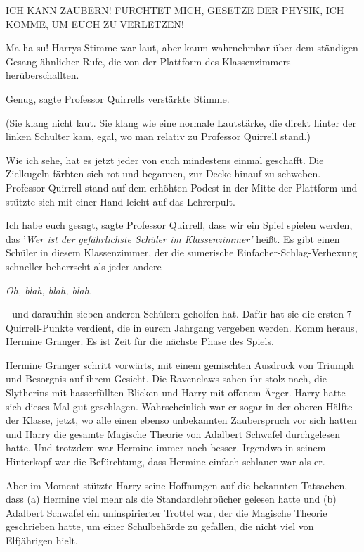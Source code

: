 ICH KANN ZAUBERN! FÜRCHTET MICH, GESETZE DER PHYSIK, ICH KOMME, UM EUCH ZU
VERLETZEN!

\glqq{}Ma-ha-su!\grqq{} Harrys Stimme war laut, aber kaum wahrnehmbar über dem
ständigen Gesang ähnlicher Rufe, die von der Plattform des Klassenzimmers
herüberschallten.

\glqq{}Genug\grqq{}, sagte Professor Quirrells verstärkte Stimme.

(Sie klang nicht laut. Sie klang wie eine normale Lautstärke, die direkt hinter
der linken Schulter kam, egal, wo man relativ zu Professor Quirrell stand.)

\glqq{}Wie ich sehe, hat es jetzt jeder von euch mindestens einmal
geschafft.\grqq{} Die Zielkugeln färbten sich rot und begannen, zur Decke hinauf
zu schweben. Professor Quirrell stand auf dem erhöhten Podest in der Mitte der
Plattform und stützte sich mit einer Hand leicht auf das Lehrerpult.

\glqq{}Ich habe euch gesagt\grqq{}, sagte Professor Quirrell, \glqq{}dass wir ein
Spiel spielen werden, das '\emph{Wer ist der gefährlichste Schüler im
Klassenzimmer'} heißt. Es gibt einen Schüler in diesem Klassenzimmer, der die
sumerische Einfacher-Schlag-Verhexung schneller beherrscht als jeder andere
-\grqq{}

\emph{Oh, blah, blah, blah.}

\glqq{}- und daraufhin sieben anderen Schülern geholfen hat. Dafür hat sie die
ersten 7 Quirrell-Punkte verdient, die in eurem Jahrgang vergeben werden. Komm
heraus, Hermine Granger. Es ist Zeit für die nächste Phase des Spiels.\grqq{}

Hermine Granger schritt vorwärts, mit einem gemischten Ausdruck von Triumph und
Besorgnis auf ihrem Gesicht. Die Ravenclaws sahen ihr stolz nach, die Slytherins
mit hasserfüllten Blicken und Harry mit offenem Ärger. Harry hatte sich dieses
Mal gut geschlagen. Wahrscheinlich war er sogar in der oberen Hälfte der Klasse,
jetzt, wo alle einen ebenso unbekannten Zauberspruch vor sich hatten und Harry
die gesamte Magische Theorie von Adalbert Schwafel durchgelesen hatte. Und
trotzdem war Hermine immer noch besser. Irgendwo in seinem Hinterkopf war die
Befürchtung, dass Hermine einfach schlauer war als er.

Aber im Moment stützte Harry seine Hoffnungen auf die bekannten Tatsachen, dass
(a) Hermine viel mehr als die Standardlehrbücher gelesen hatte und (b) Adalbert
Schwafel ein uninspirierter Trottel war, der die Magische Theorie geschrieben
hatte, um einer Schulbehörde zu gefallen, die nicht viel von Elfjährigen hielt.

